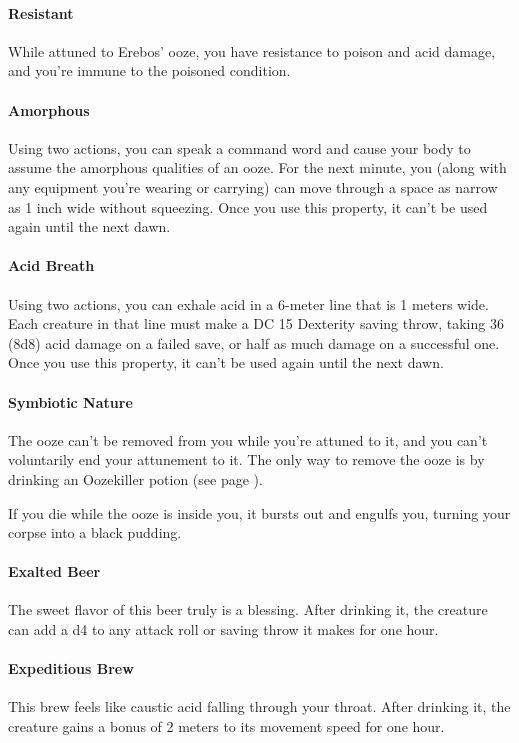     \paragraph{Resistant} While attuned to Erebos' ooze, you have resistance to poison and acid damage, and you're immune to the poisoned condition.
    \paragraph{Amorphous} Using two actions, you can speak a command word and cause your body to assume the amorphous qualities of an ooze.
    For the next minute, you (along with any equipment you're wearing or carrying) can move through a space as narrow as 1 inch wide without squeezing.
    Once you use this property, it can't be used again until the next dawn.
    \paragraph{Acid Breath} Using two actions, you can exhale acid in a 6-meter line that is 1 meters wide.
    Each creature in that line must make a DC 15 Dexterity saving throw, taking 36 (8d8) acid damage on a failed save, or half as much damage on a successful one.
    Once you use this property, it can't be used again until the next dawn.
    \paragraph{Symbiotic Nature} The ooze can't be removed from you while you're attuned to it, and you can't voluntarily end your attunement to it.
    The only way to remove the ooze is by drinking an Oozekiller potion (see page \pageref{item::oozekiller}).

    If you die while the ooze is inside you, it bursts out and engulfs you, turning your corpse into a black pudding.
\paragraph{Exalted Beer} %
    The sweet flavor of this beer truly is a blessing.
    After drinking it, the creature can add a d4 to any attack roll or saving throw it makes for one hour.
\paragraph{Expeditious Brew} %
    This brew feels like caustic acid falling through your throat.
    After drinking it, the creature gains a bonus of 2 meters to its movement speed for one hour.
